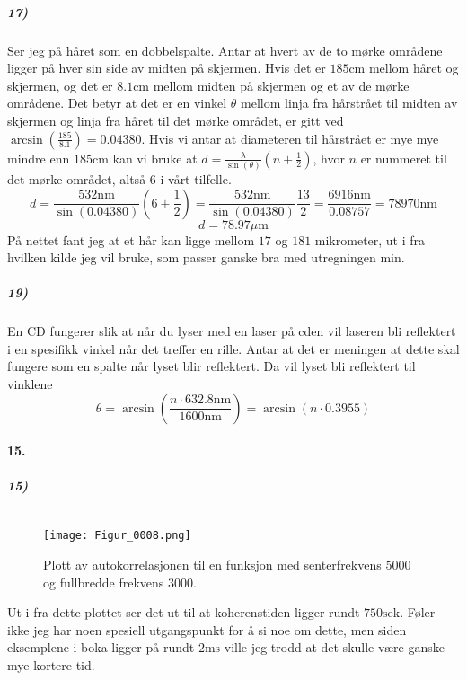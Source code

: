 \documentclass[11pt, A4paper,norsk]{article}
\begin{document}
			\subparagraph{17)}
				\begin{flushleft}
Ser jeg på håret som en dobbelspalte. Antar at hvert av de to mørke områdene ligger på hver sin side av midten på skjermen. Hvis det er $185 \text{cm}$ mellom håret og skjermen, og det er $8.1 \text{cm}$ mellom midten på skjermen og et av de mørke områdene. Det betyr at det er en vinkel $\theta$ mellom linja fra hårstrået til midten av skjermen og linja fra håret til det mørke området, er gitt ved $\arcsin\left( \frac{185}{8.1} \right) = 0.04380$. Hvis vi antar at diameteren til hårstrået er mye mye mindre enn $185 \text{cm}$ kan vi bruke at $d = \frac{\lambda}{\sin(\theta)} \left( n + \frac{1}{2} \right)$, hvor $n$ er nummeret til det mørke området, altså $6$ i vårt tilfelle.
$$d = \frac{532 \text{nm}}{\sin(0.04380)} \left( 6 + \frac{1}{2} \right) = \frac{532 \text{nm}}{\sin(0.04380)} \frac{13}{2} = \frac{6916 \text{nm}}{0.08757} = 78970 \text{nm}$$
$$d = 78.97 \text{$\mu$m}$$
På nettet fant jeg at et hår kan ligge mellom $17$ og $181$ mikrometer, ut i fra hvilken kilde jeg vil bruke, som passer ganske bra med utregningen min.
				\end{flushleft}









			\subparagraph{19)}
				\begin{flushleft}
En CD fungerer slik at når du lyser med en laser på cden vil laseren bli reflektert i en spesifikk vinkel når det treffer en rille. Antar at det er meningen at dette skal fungere som en spalte når lyset blir reflektert. Da vil lyset bli reflektert til vinklene
$$\theta = \arcsin\left( \frac{n \cdot 632.8 \text{nm}}{1600 \text{nm}} \right) = \arcsin\left( n \cdot 0.3955 \right)$$
				\end{flushleft}











		\paragraph{15.}
			\subparagraph{15)} $ $
				\begin{figure}[H]
\texttt{[image: Figur\_0008.png]}
\caption{Plott av autokorrelasjonen til en funksjon med senterfrekvens $5000$ og fullbredde frekvens $3000$.}
				\end{figure}
				\begin{flushleft}
Ut i fra dette plottet ser det ut til at koherenstiden ligger rundt $750 \text{sek}$. Føler ikke jeg har noen spesiell utgangspunkt for å si noe om dette, men siden eksemplene i boka ligger på rundt $2 \text{ms}$ ville jeg trodd at det skulle være ganske mye kortere tid.
				\end{flushleft}

\end{document}
